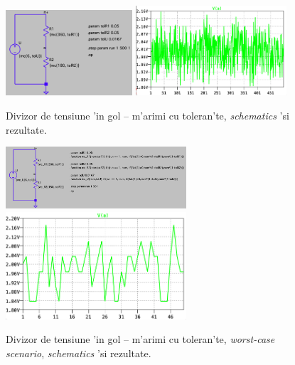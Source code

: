 \begin{figure}[h]
	\centering
		\includegraphics[width=0.42\textwidth]{laborator_01/figuri/spice_schematics_tolerante}
		\includegraphics[width=0.5\textwidth]{laborator_01/figuri/spice_rezultate_tolerante}
	\caption{Divizor de tensiune 'in gol -- m'arimi cu toleran'te, {\em schematics} 'si rezultate.}
	\label{fig:spice_tolerante}
	\centering
		\includegraphics[width=0.6\textwidth]{laborator_01/figuri/spice_schematics_tolerante_wc}\\
		\includegraphics[width=0.6\textwidth]{laborator_01/figuri/spice_rezultate_tolerante_wc}
	\caption{Divizor de tensiune 'in gol -- m'arimi cu toleran'te, {\em worst-case scenario}, {\em schematics} 'si rezultate.}
	\label{fig:spice_tolerante_wc}
\end{figure}

\newpage

